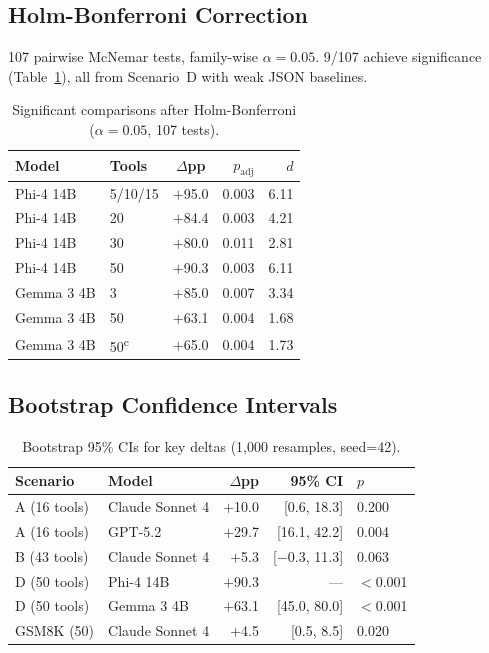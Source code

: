 \documentclass[11pt,a4paper]{article}
\begin{document}
\subsection{Holm-Bonferroni Correction}
\label{app:holm-bonferroni}

107 pairwise McNemar tests, family-wise $\alpha = 0.05$. 9/107 achieve significance (Table~\ref{tab:holm-bonferroni}), all from Scenario~D with weak JSON baselines.

\begin{table}[h]
\centering
\small
\caption{Significant comparisons after Holm-Bonferroni ($\alpha = 0.05$, 107 tests).}
\label{tab:holm-bonferroni}
\begin{tabular}{@{}llcrr@{}}
\toprule
\textbf{Model} & \textbf{Tools} & \textbf{$\Delta$pp} & \textbf{$p_{\mathrm{adj}}$} & \textbf{$d$} \\
\midrule
Phi-4 14B    & 5/10/15 & $+$95.0 & 0.003 & 6.11 \\
Phi-4 14B    & 20 & $+$84.4 & 0.003 & 4.21 \\
Phi-4 14B    & 30 & $+$80.0 & 0.011 & 2.81 \\
Phi-4 14B    & 50 & $+$90.3 & 0.003 & 6.11 \\
Gemma 3 4B   & 3  & $+$85.0 & 0.007 & 3.34 \\
Gemma 3 4B   & 50 & $+$63.1 & 0.004 & 1.68 \\
Gemma 3 4B   & 50\textsuperscript{c} & $+$65.0 & 0.004 & 1.73 \\
\bottomrule
\end{tabular}
\end{table}

\subsection{Bootstrap Confidence Intervals}
\label{app:bootstrap-ci}

\begin{table}[h]
\centering
\small
\caption{Bootstrap 95\% CIs for key deltas (1{,}000 resamples, seed=42).}
\label{tab:bootstrap-ci}
\begin{tabular}{@{}llrrl@{}}
\toprule
\textbf{Scenario} & \textbf{Model} & \textbf{$\Delta$pp} & \textbf{95\% CI} & \textbf{$p$} \\
\midrule
A (16 tools) & Claude Sonnet 4 & $+$10.0 & [0.6, 18.3] & 0.200 \\
A (16 tools) & GPT-5.2 & $+$29.7 & [16.1, 42.2] & 0.004 \\
B (43 tools) & Claude Sonnet 4 & $+$5.3 & [$-$0.3, 11.3] & 0.063 \\
D (50 tools) & Phi-4 14B & $+$90.3 & --- & $<$0.001 \\
D (50 tools) & Gemma 3 4B & $+$63.1 & [45.0, 80.0] & $<$0.001 \\
GSM8K (50)   & Claude Sonnet 4 & $+$4.5 & [0.5, 8.5] & 0.020 \\
\bottomrule
\end{tabular}
\end{table}
\end{document}

